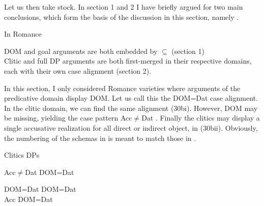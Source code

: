 \documentclass[output=paper]{langscibook}
\begin{document}
Let us then take stock. In section 1 and 2 I have briefly argued for two main conclusions, which form the basis of the discussion in this section, namely .

\ea\label{ex:manzini:}
In Romance\\
\begin{xlist}
\ex DOM and goal arguments are both embedded by ${\subseteq}$ (section 1)\\
\ex Clitic and full DP arguments are both first-merged in their respective domains, each with their own case alignment (section 2).
\end{xlist}
\z

In this section, I only considered Romance varieties where arguments of the predicative domain display DOM. Let us call this the DOM=Dat case alignment. In the clitic domain, we can find the same alignment (30bi). However, DOM may be missing, yielding the case pattern Acc${\neq}$Dat . Finally the clitics may display a single accusative realization for all direct or indirect object, in (30bii). Obviously, the numbering of the schemas in  is meant to match those in .

\ea\label{ex:manzini:}
Clitics DPs \\
\begin{xlist}
\ex Acc${\neq}$Dat      DOM=Dat\\
\ex \begin{xlist}
\ex DOM=Dat    DOM=Dat\\
\ex Acc        DOM=Dat \\
\end{xlist}
\end{xlist}
\z 
\end{document}
